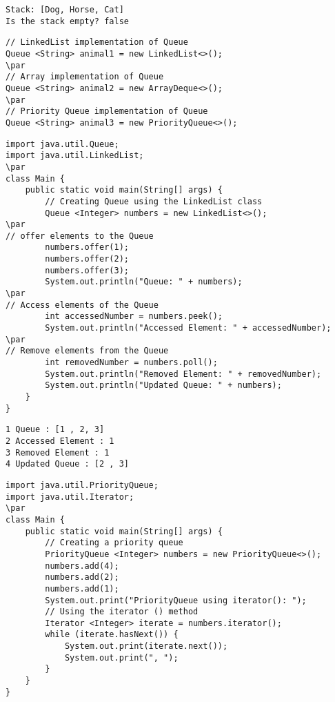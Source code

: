 \documentclass{book}
\def\lthtmlcheckvsize{\ifdim\ht\sizebox<\vsize 
  \ifdim\wd\sizebox<\hsize\expandafter\hfill\fi \expandafter\vfill
  \else\expandafter\vss\fi}%
\begin{document}
{\newpage\clearpage
{}%
\begin{lstlisting}
Stack: [Dog, Horse, Cat]
Is the stack empty? false
\end{lstlisting}%
\lthtmlfigureZ
\lthtmlcheckvsize\clearpage}

{\newpage\clearpage
{}%
\begin{lstlisting}
// LinkedList implementation of Queue
Queue <String> animal1 = new LinkedList<>();
\par
// Array implementation of Queue
Queue <String> animal2 = new ArrayDeque<>();
\par
// Priority Queue implementation of Queue
Queue <String> animal3 = new PriorityQueue<>();
\end{lstlisting}%
\lthtmlfigureZ
\lthtmlcheckvsize\clearpage}

{\newpage\clearpage
{}%
\begin{lstlisting}
import java.util.Queue;
import java.util.LinkedList;
\par
class Main {
	public static void main(String[] args) {
		// Creating Queue using the LinkedList class
		Queue <Integer> numbers = new LinkedList<>();
\par
// offer elements to the Queue
		numbers.offer(1);
		numbers.offer(2);
		numbers.offer(3);
		System.out.println("Queue: " + numbers);
\par
// Access elements of the Queue
		int accessedNumber = numbers.peek();
		System.out.println("Accessed Element: " + accessedNumber);
\par
// Remove elements from the Queue
		int removedNumber = numbers.poll();
		System.out.println("Removed Element: " + removedNumber);
		System.out.println("Updated Queue: " + numbers);
	}
}
\end{lstlisting}%
\lthtmlfigureZ
\lthtmlcheckvsize\clearpage}

{\newpage\clearpage
{}%
\begin{lstlisting}
1 Queue : [1 , 2, 3]
2 Accessed Element : 1
3 Removed Element : 1
4 Updated Queue : [2 , 3]
\end{lstlisting}%
\lthtmlfigureZ
\lthtmlcheckvsize\clearpage}

{\newpage\clearpage
{}%
\begin{lstlisting}
import java.util.PriorityQueue;
import java.util.Iterator;
\par
class Main {
	public static void main(String[] args) {
		// Creating a priority queue
		PriorityQueue <Integer> numbers = new PriorityQueue<>();
		numbers.add(4);
		numbers.add(2);
		numbers.add(1);
		System.out.print("PriorityQueue using iterator(): ");
		// Using the iterator () method
		Iterator <Integer> iterate = numbers.iterator();
		while (iterate.hasNext()) {
			System.out.print(iterate.next());
			System.out.print(", ");
		}
	}
}
\end{lstlisting}%
\lthtmlfigureZ
\lthtmlcheckvsize\clearpage}
\end{document}
